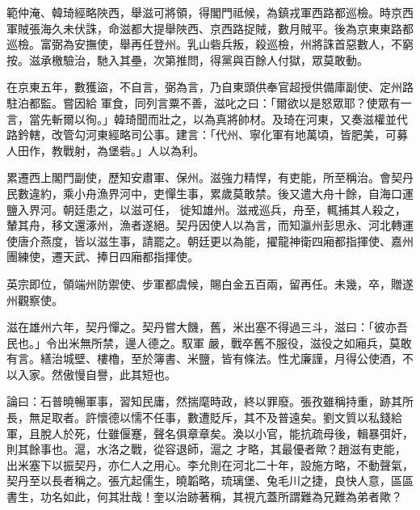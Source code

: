 \begin{pinyinscope}
 範仲淹、韓琦經略陜西，舉滋可將領，得閣門祗候，為鎮戎軍西路都巡檢。時京西軍賊張海久未伏誅，命滋都大提舉陜西、京西路捉賊，數月賊平。後為京東東路都巡檢。富弼為安撫使，舉再任登州。乳山砦兵叛，殺巡檢，州將誅首惡數人，不窮按。滋承檄驗治，馳入其壘，次第推問，得黨與百餘人付獄，眾莫敢動。



 在京東五年，數獲盜，不自言，弼為言，乃自東頭供奉官超授供備庫副使、定州路駐泊都監。嘗因給
 軍食，同列言粟不善，滋叱之曰：「爾欲以是怒眾耶？使眾有一言，當先斬爾以徇。」韓琦聞而壯之，以為真將帥材。及琦在河東，又奏滋權並代路鈐轄，改管勾河東經略司公事。建言：「代州、寧化軍有地萬頃，皆肥美，可募人田作，教戰射，為堡砦。」人以為利。



 累遷西上閣門副使，歷知安肅軍、保州。滋強力精悍，有吏能，所至稱治。會契丹民數違約，乘小舟漁界河中，吏憚生事，累歲莫敢禁。後又遣大舟十餘，自海口運鹽入界河。朝廷患之，以滋可任，
 徙知雄州。滋戒巡兵，舟至，輒捕其人殺之，輦其舟，移文還涿州，漁者遂絕。契丹因使人以為言，而知瀛州彭思永、河北轉運使唐介燕度，皆以滋生事，請罷之。朝廷更以為能，擢龍神衛四廂都指揮使、嘉州團練使，遷天武、捧日四廂都指揮使。



 英宗即位，領端州防禦使、步軍都虞候，賜白金五百兩，留再任。未幾，卒，贈遂州觀察使。



 滋在雄州六年，契丹憚之。契丹嘗大饑，舊，米出塞不得過三斗，滋曰：「彼亦吾民也。」令出米無所禁，邊人德之。馭軍
 嚴，戰卒舊不服役，滋役之如廂兵，莫敢有言。繕治城壁、樓櫓，至於簿書、米鹽，皆有條法。性尤廉謹，月得公使酒，不以入家。然傲慢自譽，此其短也。



 論曰：石普曉暢軍事，習知民庸，然揣麾時政，終以罪廢。張孜雖稱持重，跡其所長，無足取者。許懷德以懦不任事，數遭貶斥，其不及普遠矣。劉文質以私錢給軍，且脫人於死，仕雖偃蹇，聲名俱章章矣。渙以小官，能抗疏母後，輯暴弭奸，則其餘事也。滬，水洛之戰，從容退師，滬之
 才略，其最優者歟？趙滋有吏能，出米塞下以振契丹，亦仁人之用心。李允則在河北二十年，設施方略，不動聲氣，契丹至以長者稱之。張亢起儒生，曉韜略，琉璃堡、兔毛川之捷，良快人意，區區書生，功名如此，何其壯哉！奎以治跡著稱，其視亢蓋所謂難為兄難為弟者歟？



\end{pinyinscope}